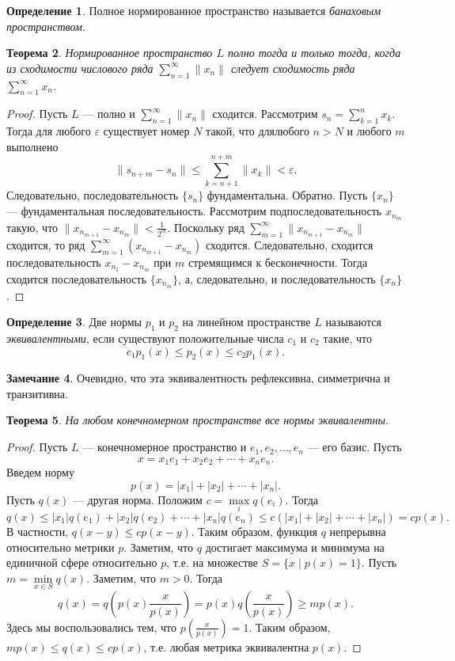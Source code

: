 \documentclass[12pt, titlepage, oneside]{amsbook}
\newtheorem{theorem}{Теорема}[chapter]
\theoremstyle{definition}
\newtheorem{definition}[theorem]{Определение}
\newtheorem{remark}[theorem]{Замечание}
\theoremstyle{remark}
\begin{document}
\begin{definition}
Полное нормированное пространство называется \emph{банаховым пространством}.
\end{definition}

\begin{theorem}
\label{Nor1}
Нормированное пространство $L$ полно тогда и только тогда, когда из сходимости числового ряда $\sum\limits_{n=1}^{\infty}\|x_n\|$ следует сходимость ряда $\sum\limits_{n=1}^{\infty}x_n$.
\end{theorem}

\begin{proof}
Пусть $L$ --- полно и $\sum\limits_{n=1}^{\infty}\|x_n\|$ сходится. Рассмотрим $s_n=\sum\limits_{k=1}^{n}x_k$. Тогда для любого $\varepsilon$ существует номер $N$ такой, что длялюбого $n>N$ и любого $m$ выполнено $$\|s_{n+m}-s_n\|\leq\sum\limits_{k=n+1}^{n+m}\|x_k\|<\varepsilon.$$ Следовательно, последовательность $\{s_n\}$ фундаментальна. Обратно. Пусть $\{x_n\}$ --- фундаментальная последовательность. Рассмотрим подпоследовательность $x_{n_m}$ такую, что $\|x_{n_{m+1}}-x_{n_m}\|<\frac{1}{2^m}$. Поскольку ряд $\sum\limits_{m=1}^{\infty}\|x_{n_{m+1}}-x_{n_m}\|$ сходится, то ряд $\sum\limits_{m=1}^{\infty}(x_{n_{m+1}}-x_{n_m})$ сходится. Следовательно, сходится последовательность $x_{n_{1}}-x_{n_m}$ при $m$ стремящимся к бесконечности. Тогда сходится последовательность $\{x_{n_m}\}$, а, следовательно, и последовательность $\{x_n\}$.
\end{proof}

\begin{definition}
Две нормы $p_1$ и $p_2$ на линейном пространстве $L$ называются \emph{эквивалентными}, если существуют положительные числа $c_1$ и $c_2$ такие, что $$c_1p_1(x)\leq p_2(x)\leq c_2p_1(x).$$
\end{definition}

\begin{remark}
Очевидно, что эта эквивалентность рефлексивна, симметрична и транзитивна.
\end{remark}

\begin{theorem}
\label{Nor2}
На любом конечномерном пространстве все нормы эквивалентны.
\end{theorem}

\begin{proof}
Пусть $L$ --- конечномерное пространство и $e_1,e_2,\ldots, e_n$ --- его базис. Пусть $$x=x_1e_1+x_2e_2+\cdots+x_ne_n.$$ Введем норму $$p(x)=|x_1|+|x_2|+\cdots+|x_n|.$$ Пусть $q(x)$ --- другая норма. Положим $c=\max\limits_i q(e_i)$. Тогда $$q(x)\leq |x_1|q(e_1)+|x_2|q(e_2)+\cdots+|x_n|q(e_n)\leq c(|x_1|+|x_2|+\cdots+|x_n|)=cp(x).$$ В частности, $q(x-y)\leq cp(x-y)$. Таким образом, функция $q$ непрерывна относительно метрики $p$. Заметим, что $q$ достигает максимума и минимума на единичной сфере относительно $p$, т.е. на множестве $S=\{x\mid p(x)=1\}$. Пусть $m=\min\limits_{x\in S}q(x)$. Заметим, что $m>0$. Тогда $$q(x)=q\left(p(x)\frac{x}{p(x)}\right)=p(x)q\left(\frac{x}{p(x)}\right)\geq mp(x).$$ Здесь мы воспользовались тем, что $p(\frac{x}{p(x)})=1$. Таким образом, $mp(x)\leq q(x)\leq cp(x)$, т.е. любая метрика эквивалентна $p(x)$.
\end{proof}
\end{document}
